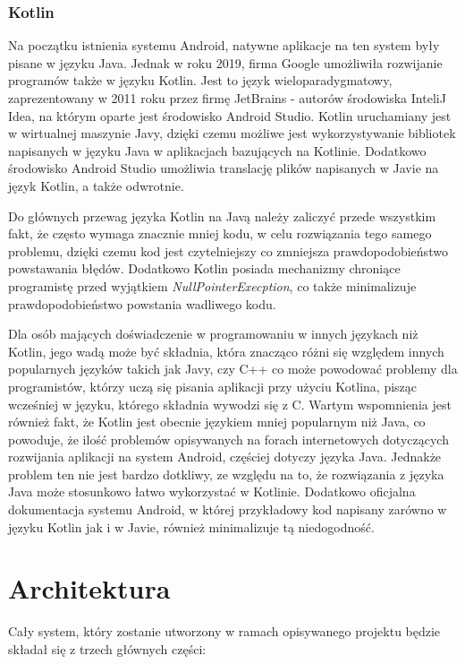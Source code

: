 \documentclass[a4paper,12pt,twoside,openany]{report}
\begin{document}
\subsection{Kotlin}
Na początku istnienia systemu Android, natywne aplikacje na ten system były pisane w języku Java. Jednak w roku 2019, firma Google umożliwiła rozwijanie programów także w języku Kotlin. Jest to język wieloparadygmatowy, zaprezentowany w 2011 roku przez firmę JetBrains - autorów środowiska InteliJ Idea, na którym oparte jest środowisko Android Studio. Kotlin uruchamiany jest w wirtualnej maszynie Javy, dzięki czemu możliwe jest wykorzystywanie bibliotek napisanych w języku Java w aplikacjach bazujących na Kotlinie. Dodatkowo środowisko Android Studio umożliwia translację plików napisanych w Javie na język Kotlin, a także odwrotnie. 

Do głównych przewag języka Kotlin na Javą należy zaliczyć przede wszystkim fakt, że często wymaga znacznie mniej kodu, w celu rozwiązania tego samego problemu, dzięki czemu kod jest czytelniejszy co zmniejsza prawdopodobieństwo powstawania błędów. Dodatkowo Kotlin posiada mechanizmy chroniące programistę przed wyjątkiem \textit{NullPointerExecption}, co także minimalizuje prawdopodobieństwo powstania wadliwego kodu. 

Dla osób mających doświadczenie w programowaniu w innych językach niż Kotlin, jego wadą może być składnia, która znacząco różni się względem innych popularnych języków takich jak Javy, czy C++ co może powodować problemy dla programistów, którzy uczą się pisania aplikacji przy użyciu  Kotlina, pisząc wcześniej w języku, którego składnia wywodzi się z C. Wartym wspomnienia jest również fakt, że Kotlin jest obecnie językiem mniej popularnym niż Java, co powoduje, że ilość problemów opisywanych na forach internetowych dotyczących rozwijania aplikacji na system Android, częściej dotyczy języka Java. Jednakże problem ten nie jest bardzo dotkliwy, ze względu na to, że rozwiązania z języka Java może stosunkowo łatwo wykorzystać w Kotlinie. Dodatkowo oficjalna dokumentacja systemu Android, w której przykładowy kod napisany zarówno w języku Kotlin jak i w Javie, również minimalizuje tą niedogodność. 

\chapter{Architektura}
Cały system, który zostanie utworzony w ramach opisywanego projektu będzie składał się z trzech głównych części: 
\end{document}

